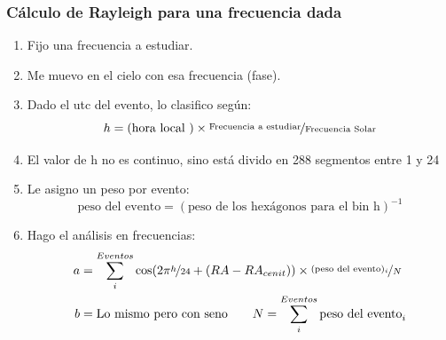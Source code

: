

  \subsubsection{Cálculo de Rayleigh para una frecuencia dada}

      \begin{enumerate}
        \item Fijo una frecuencia a estudiar.
        \item Me muevo en el cielo con esa frecuencia (fase).
        \item Dado el utc del evento, lo clasifico según:
        \begin{equation*}
          h = (\text{hora local })\times \nicefrac{\text{Frecuencia a estudiar}}{\text{Frecuencia Solar}}
        \end{equation*}
          \item El valor de h no es continuo, sino está divido en 288 segmentos entre 1 y 24
       \item Le asigno un peso por evento:
        \begin{equation*}
          \text{peso del evento} = (\text{peso  de los hexágonos para el bin h})^{-1}
          \end{equation*} 
         \item Hago el análisis en frecuencias:
         \begin{align*}
             a &= \sum^{Eventos}_i \cos(2\pi \nicefrac{h}{24} + (RA -RA_{cenit}))\times \nicefrac{(\text{peso del evento})_i}{N}\\
             b &= \text{Lo mismo pero con seno}\qquad         N = \sum^{Eventos}_i \text{peso del evento}_i
         \end{align*}
      \end{enumerate}